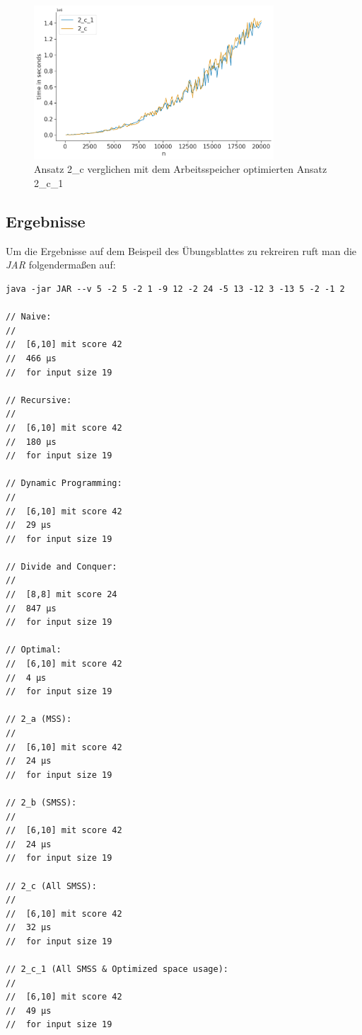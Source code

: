 \documentclass[10pt]{article}
\begin{document}
\begin{figure}[t]
    \centering
    \includegraphics[width=0.8\textwidth]{../times_2c_20000.png}
    \caption{Ansatz 2\_c verglichen mit dem Arbeitsspeicher optimierten Ansatz 2\_c\_1}
    \label{fig:time_comp_2c}
\end{figure}



\newpage
\subsection{Ergebnisse}\label{performance_on_sheet_vec}
Um die  Ergebnisse auf dem Beispeil des Übungsblattes 
zu rekreiren ruft man die \textit{JAR} folgenderma\ss en auf:

\begin{verbatim}
java -jar JAR --v 5 -2 5 -2 1 -9 12 -2 24 -5 13 -12 3 -13 5 -2 -1 2

// Naive:
//
// 	[6,10] mit score 42
// 	466 µs
// 	for input size 19

// Recursive:
//
// 	[6,10] mit score 42
// 	180 µs
// 	for input size 19

// Dynamic Programming:
//
// 	[6,10] mit score 42
// 	29 µs
// 	for input size 19

// Divide and Conquer:
//
// 	[8,8] mit score 24
// 	847 µs
// 	for input size 19

// Optimal:
// 	[6,10] mit score 42
// 	4 µs
// 	for input size 19

// 2_a (MSS):
//
// 	[6,10] mit score 42
// 	24 µs
// 	for input size 19

// 2_b (SMSS):
//
// 	[6,10] mit score 42
// 	24 µs
// 	for input size 19

// 2_c (All SMSS):
//
// 	[6,10] mit score 42
// 	32 µs
// 	for input size 19

// 2_c_1 (All SMSS & Optimized space usage):
//
// 	[6,10] mit score 42
// 	49 µs
// 	for input size 19
\end{verbatim}
\end{document}

